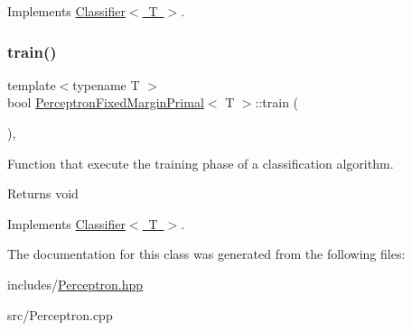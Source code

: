 Implements \mbox{\hyperlink{class_classifier_ab3b9544a8d9c3cbde8d5865c7e9be0fb}{Classifier$<$ T $>$}}.

\mbox{\label{class_perceptron_fixed_margin_primal_a6d4a14b9f39a4fef45de201edfeabce0}} 
\subsubsection{\texorpdfstring{train()}{train()}}
{\footnotesize\ttfamily template$<$typename T $>$ \\
bool \mbox{\hyperlink{class_perceptron_fixed_margin_primal}{Perceptron\+Fixed\+Margin\+Primal}}$<$ T $>$\+::train (\begin{DoxyParamCaption}{ }\end{DoxyParamCaption})\hspace{0.3cm}{\ttfamily [override]}, {\ttfamily [virtual]}}



Function that execute the training phase of a classification algorithm. 

\begin{DoxyReturn}{Returns}
void 
\end{DoxyReturn}


Implements \mbox{\hyperlink{class_classifier_a120849bfdfa3ba7a0388b32b2d76bf4f}{Classifier$<$ T $>$}}.



The documentation for this class was generated from the following files\+:\begin{DoxyCompactItemize}
\item 
includes/\mbox{\hyperlink{_perceptron_8hpp}{Perceptron.\+hpp}}\item 
src/Perceptron.\+cpp\end{DoxyCompactItemize}
